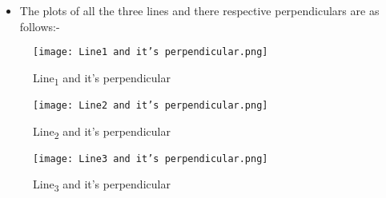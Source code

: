 \documentclass[journal,12pt,twocolumn]{IEEEtran}
\begin{document}
\begin{itemize}
\item The plots of all the three lines and there respective perpendiculars are as follows:-
\end{itemize}
\begin{figure}[H]
\centering
\texttt{[image: Line1 and it's perpendicular.png]}
\caption{Line\textsubscript{1} and it's perpendicular}
\label{fig:circle}	
\end{figure}
\begin{figure}[H]
\centering
\texttt{[image: Line2 and it's perpendicular.png]}
\caption{Line\textsubscript{2} and it's perpendicular}
\label{fig:circle}	
\end{figure}
\begin{figure}[H]
\centering
\texttt{[image: Line3 and it's perpendicular.png]}
\caption{Line\textsubscript{3} and it's perpendicular}
\label{fig:circle}	
\end{figure}
\end{document}
